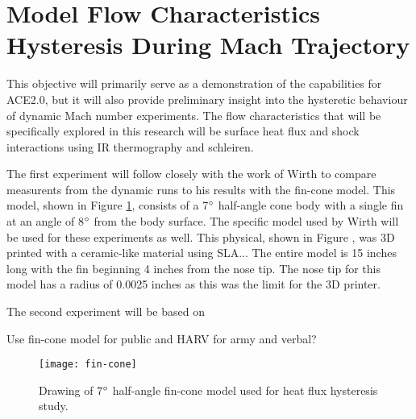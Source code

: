 \section{Model Flow Characteristics Hysteresis During Mach Trajectory}

This objective will primarily serve as a demonstration of the capabilities for ACE2.0, but it will also provide preliminary insight into the hysteretic behaviour of dynamic Mach number experiments. The flow characteristics that will be specifically explored in this research will be surface heat flux and shock interactions using IR thermography and schleiren.

The first experiment will follow closely with the work of Wirth \cite{wirth} to compare measurents from the dynamic runs to his results with the fin-cone model. This model, shown in Figure \ref{fig:fin-cone}, consists of a 7$\degree$ half-angle cone body with a single fin at an angle of 8$\degree$ from the body surface. The specific model used by Wirth will be used for these experiments as well. This physical, shown in Figure , was 3D printed with a ceramic-like material using SLA... The entire model is 15 inches long with the fin beginning 4 inches from the nose tip. The nose tip for this model has a radius of 0.0025 inches as this was the limit for the 3D printer. 

The second experiment will be based on 

Use fin-cone model for public and HARV for army and verbal?

\begin{figure}[ht]
    \centering
    \texttt{[image: fin-cone]}
    \caption{Drawing of 7$\degree$ half-angle fin-cone model used for heat flux hysteresis study.}
    \label{fig:fin-cone}
\end{figure}

